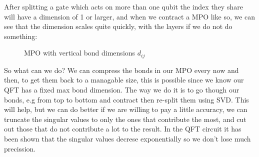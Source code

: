 \noindent
After splitting a gate which acts on more than one qubit the index they share will have a dimension of 1 or larger, and when we contract a MPO like so, we can see that the dimension scales quite quickly, with the layers if we do not do something: 
\begin{figure}[H]
    \centering 

    \caption{MPO with vertical bond dimensions $d_{ij}$}
    \label{fig:mpo_contraction}
\end{figure}
\noindent 
So what can we do? We can compress the bonds in our MPO every now and then, to get them back to a managable size, this is possible since we know our QFT has a fixed max bond dimension. The way we do it is to go though our bonds, e.g from top to bottom and contract then re-split them using SVD. This will help, but we can do better if we are willing to pay a little accuracy, we can truncate the singular values to only the ones that contribute the most, and cut out those that do not contribute a lot to the result. In the QFT circuit it has been shown that the singular values decrese exponentially so we don't lose much precission.   

